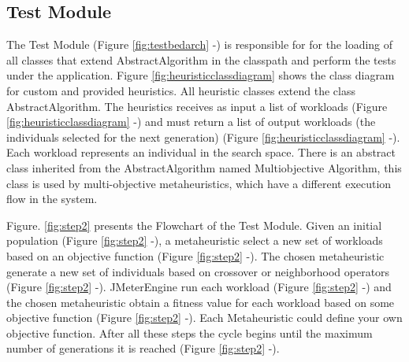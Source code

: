 \documentclass[espaco=umemeio,chapter=TITLE,twoside,openright]{abnt}
\begin{document}
\subsection{Test Module}

The Test Module (Figure \ref{fig:testbedarch}  -) is responsible for for the loading of all classes that extend AbstractAlgorithm in the classpath and perform the tests under the application. Figure \ref{fig:heuristicclassdiagram} shows the  class diagram for custom and provided heuristics. All heuristic classes extend the class AbstractAlgorithm. The heuristics receives  as input a  list of workloads (Figure \ref{fig:heuristicclassdiagram}  -) and must return a list of output workloads (the individuals selected for the next generation)  (Figure \ref{fig:heuristicclassdiagram}  -). Each workload represents an individual in the search space. There is an abstract class inherited from the AbstractAlgorithm named Multiobjective Algorithm, this class is used by multi-objective metaheuristics, which have a different execution flow in the system.

Figure. \ref{fig:step2} presents the Flowchart of the Test Module. Given an initial population (Figure \ref{fig:step2}  -),  a metaheuristic select a new set of workloads based on an objective function (Figure \ref{fig:step2}  -). The chosen metaheuristic generate a new set of individuals based on crossover or neighborhood operators (Figure \ref{fig:step2}  -).  JMeterEngine run each workload (Figure \ref{fig:step2}  -) and the chosen metaheuristic obtain a fitness value for each workload based on some objective function  (Figure \ref{fig:step2}  -). Each Metaheuristic could define your own objective function. After all these steps the cycle begins until the maximum number of generations it is reached (Figure \ref{fig:step2}  -).
\end{document}
